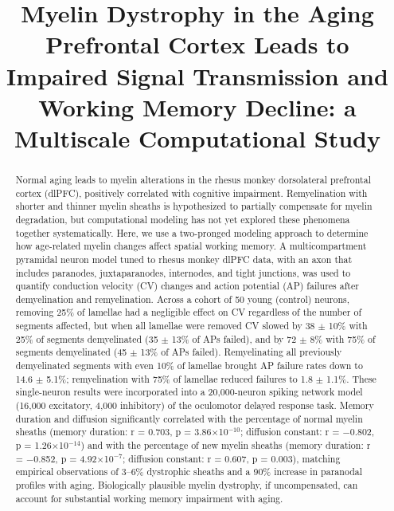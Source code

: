\documentclass[11pt]{article}
\title{Myelin Dystrophy in the Aging Prefrontal Cortex Leads to Impaired Signal Transmission and Working Memory Decline: a Multiscale Computational Study}
\author{}
\date{}
\begin{document}
\maketitle

\begin{abstract}
Normal aging leads to myelin alterations in the rhesus monkey dorsolateral prefrontal cortex (dlPFC), positively correlated with cognitive impairment. Remyelination with shorter and thinner myelin sheaths is hypothesized to partially compensate for myelin degradation, but computational modeling has not yet explored these phenomena together systematically. Here, we use a two-pronged modeling approach to determine how age-related myelin changes affect spatial working memory. A multicompartment pyramidal neuron model tuned to rhesus monkey dlPFC data, with an axon that includes paranodes, juxtaparanodes, internodes, and tight junctions, was used to quantify conduction velocity (CV) changes and action potential (AP) failures after demyelination and remyelination. Across a cohort of 50 young (control) neurons, removing 25\% of lamellae had a negligible effect on CV regardless of the number of segments affected, but when all lamellae were removed CV slowed by 38 $\pm$ 10\% with 25\% of segments demyelinated (35 $\pm$ 13\% of APs failed), and by 72 $\pm$ 8\% with 75\% of segments demyelinated (45 $\pm$ 13\% of APs failed). Remyelinating all previously demyelinated segments with even 10\% of lamellae brought AP failure rates down to 14.6 $\pm$ 5.1\%; remyelination with 75\% of lamellae reduced failures to 1.8 $\pm$ 1.1\%. These single-neuron results were incorporated into a 20{,}000-neuron spiking network model (16{,}000 excitatory, 4{,}000 inhibitory) of the oculomotor delayed response task. Memory duration and diffusion significantly correlated with the percentage of normal myelin sheaths (memory duration: r = 0.703, p = 3.86$\times$10$^{-10}$; diffusion constant: r = $-$0.802, p = 1.26$\times$10$^{-14}$) and with the percentage of new myelin sheaths (memory duration: r = $-$0.852, p = 4.92$\times$10$^{-7}$; diffusion constant: r = 0.607, p = 0.003), matching empirical observations of 3--6\% dystrophic sheaths and a 90\% increase in paranodal profiles with aging. Biologically plausible myelin dystrophy, if uncompensated, can account for substantial working memory impairment with aging.
\end{abstract}
\end{document}
